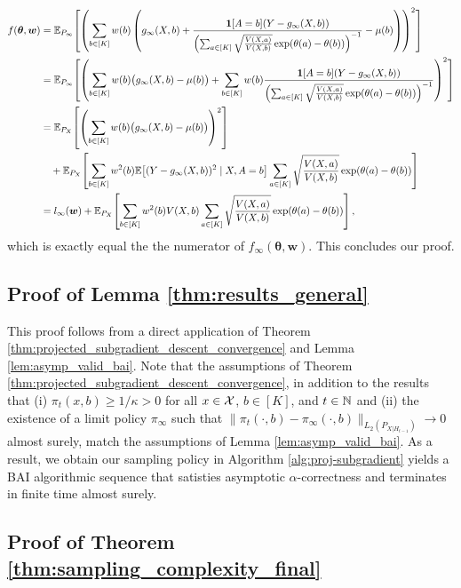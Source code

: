 \documentclass{article}
\begin{document}
\begin{appendices}
\begin{align}
f(\boldsymbol{\theta}, \boldsymbol{w}) &= \mathbb{E}_{P_\infty}\!\left[
\left(
\sum_{b \in [K]} w(b)\left(
g_\infty(X,b)
+ \frac{{\mathbf{1}[A=b](Y-g_\infty(X,b))}}{\left(\sum_{a \in [K]} \sqrt{\frac{V(X,a)}{V(X,b)}} \exp(\theta(a)-\theta(b))\right)^{-1}}
-\mu(b)
\right)
\right)^2
\right] \\
&=
\mathbb{E}_{P_\infty}\!\left[
\left(
\sum_{b \in [K]} w(b)\bigl(g_\infty(X,b)-\mu(b)\bigr)
+
\sum_{b \in [K]} w(b)\frac{{\mathbf{1}[A=b](Y-g_\infty(X,b))}}{\left(\sum_{a \in [K]} \sqrt{\frac{V(X,a)}{V(X,b)}} \exp(\theta(a)-\theta(b))\right)^{-1}}
\right)^2
\right] \\
&=
\mathbb{E}_{P_X}\!\left[
\left(\sum_{b \in [K]} w(b)\bigl(g_\infty(X,b)-\mu(b)\bigr)\right)^2
\right] \\
&\quad
+
\mathbb{E}_{P_X}\!\left[
\sum_{b \in [K]} w^2(b)
\mathbb{E}\!\left[(Y-g_\infty(X,b))^2 \mid X,A=b\right]
\sum_{a \in [K]} \sqrt{\frac{V(X,a)}{V(X,b)}} \exp(\theta(a)-\theta(b))
\right] \\
&=
l_\infty(\boldsymbol w)
+
\mathbb{E}_{P_X}\!\left[
\sum_{b \in [K]} w^2(b) V(X,b)
\sum_{a \in [K]} \sqrt{\frac{V(X,a)}{V(X,b)}} \exp(\theta(a)-\theta(b))
\right],
\end{align}
which is exactly equal the the numerator of $f_\infty(\bm\theta, \bm{w})$. This concludes our proof.

\subsection{Proof of Lemma \ref{thm:results_general}}
This proof follows from a direct application of Theorem \ref{thm:projected_subgradient_descent_convergence} and Lemma \ref{lem:asymp_valid_bai}. Note that the assumptions of Theorem \ref{thm:projected_subgradient_descent_convergence}, in addition to the results that (i) $\pi_{t}(x,b) \geq 1/\kappa > 0$ for all $x \in \mathcal{X}$, $b \in [K]$, and $t \in \mathbb{N}$ and (ii) the existence of a limit policy $\pi_\infty$ such that $\|\pi_t(\cdot, b) - \pi_\infty(\cdot, b) \|_{L_2(P_{X|H_{t-1}})} \rightarrow 0$ almost surely, match the assumptions of Lemma \ref{lem:asymp_valid_bai}. As a result, we obtain our sampling policy in Algorithm \ref{alg:proj-subgradient} yields a BAI algorithmic sequence that satisties asymptotic $\alpha$-correctness and terminates in finite time almost surely. 


\subsection{Proof of Theorem \ref{thm:sampling_complexity_final}}


\end{appendices}
\end{document}
